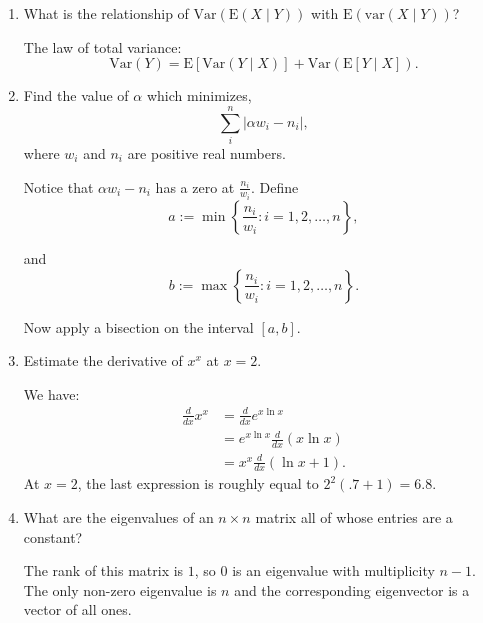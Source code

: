 \documentclass{amsart}
\theoremstyle{plain}
\numberwithin{equation}{section}
\begin{document}
\begin{enumerate}
Let $C$ be the event that the jury makes the correction decision. 
Then, conditioning on whether the judge with the coin
makes the correct decision  ($j_3$), we have

$$P(C) = P(C|j_3) P(j_3)+P(C|\neg j_3)P(\neg j_3).$$

This boils down to
$$P(C) = \frac{1}{2}\left(1-(1-p)^2\right) + \frac{1}{2} p^2 = p.$$

Thanks to the coin tossing, a three person jury has 
effectively been reduced to a one person jury. 


\item What is the relationship of $\mathrm{Var}(\mathrm{E}(X\mid Y))$ with
$\mathrm{E}(\mathrm{var}(X\mid Y))$?

The law of total variance:
$$\mathrm{Var}(Y)=\mathrm{E}[\mathrm{Var}(Y\mid X)]+
\mathrm{Var}(\mathrm{E}[Y\mid X]).$$

\item Find the value of $\alpha$ which minimizes,
\begin{equation*}
\sum_{i}^{n} \left|\alpha w_i - n_i\right|,
\end{equation*}
where $w_i$ and $n_i$ are positive real numbers.

Notice that $\alpha w_i - n_i$ has a zero at $\frac{n_i}{w_i}$. 
Define 
\begin{equation*}
a := \min \left\{ \frac{n_i}{w_i}: i = 1, 2, \ldots, n \right\},
\end{equation*}

and 
$$b := \max \left\{ \frac{n_i}{w_i}: i = 1, 2, \ldots, n \right\}.$$

Now apply a bisection on the interval $[a, b]$.

\item Estimate the derivative of $x^x$ at $x=2$.

We have:
\begin{align*}
\frac{d}{dx}x^x &= \frac{d}{dx} e^{ x\ln x} \\
&= e^{x \ln x }\frac{d}{dx}(x \ln x)\\
&= x^{x}\frac{d}{dx}(\ln x + 1 ).
\end{align*}
At $x=2$, the last expression is roughly equal to
$2^2(.7 + 1 )=6.8$.
\item What are the eigenvalues of an $n \times n$
 matrix all of whose entries are a constant?

The rank of this matrix is $1$, so $0$ is an eigenvalue
with multiplicity $n-1$. The only non-zero eigenvalue
is $n$ and the corresponding eigenvector is 
a vector of all ones. 


\end{enumerate}
\end{document}

